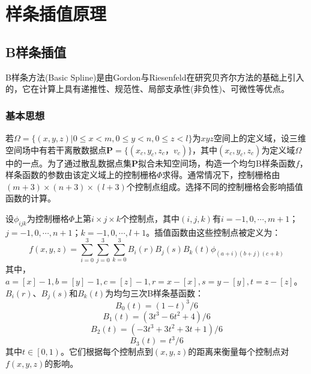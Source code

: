 \section{样条插值原理}

\subsection{B样条插值}
B样条方法(Basic Spline)是由Gordon与Riesenfeld在研究贝齐尔方法的基础上引入的，它在计算上具有递推性、规范性、局部支承性(非负性)、可微性等优点。

\subsubsection{基本思想}
若$ \Omega = \{ \left( x,y,z \right) | 0 \leq x <  m, 0 \leq y < n, 0 \leq z < l \}  $为$ xyz $空间上的定义域，设三维空间场中有若干离散数据点$ \mathbf{P} = \{ \left( x_{c},y_{c},z_{c}，v_{c} \right) \} $，其中$ \left( x_{c},y_{c},z_{c} \right) $为定义域$ \Omega $中的一点。为了通过散乱数据点集$ \mathbf{P} $拟合未知空间场，构造一个均匀B样条函数$ f $，样条函数的参数由该定义域上的控制栅格$ \Phi $求得。通常情况下，控制栅格由$ \left( m+3 \right) \times \left( n+3 \right) \times \left( l+3 \right) $个控制点组成。选择不同的控制栅格会影响插值函数的计算。

设$ \phi_{ijk} $为控制栅格$ \Phi $上第$ i \times j \times k $个控制点，其中$ \left( i,j,k \right) $有$ i=-1,0,\cdots,m+1 $；$ j=-1,0,\cdots,n+1 $；$ k=-1,0,\cdots,l+1 $。插值函数由这些控制点被定义为：
\begin{equation}
    f(x,y,z)=\sum_{i=0}^{3}\sum_{j=0}^{3}\sum_{k=0}^{3}B_{i}(r)B_{j}(s)B_{k}(t) \phi_{(a+i)(b+j)(c+k)}
    \label{三次B样条插值函数}
\end{equation}
其中，$ a=[x]-1,b=[y]-1,c=[z]-1,r=x-[x],s=y-[y],t=z-[z]$。$ B_{i}(r)\text{、}B_{j}(s)\text{和}B_{k}(t) $为均匀三次B样条基函数：
\begin{equation*}
    B_{0} \left( t \right) = \left( 1 - t \right)^{3} / 6
\end{equation*}
\begin{equation*}
    B_{1} \left( t \right) = \left( 3 t^{3} - 6 t^{2} + 4 \right) / 6
\end{equation*}
\begin{equation*}
    B_{2} \left( t \right) = \left( -3 t^{3} + 3 t^{2}  + 3 t + 1 \right) / 6
\end{equation*}
\begin{equation*}
    B_{3} \left( t \right) = t^{3} / 6
\end{equation*}
其中$ t \in \left[ 0, 1 \right) $。它们根据每个控制点到$ \left( x,y,z \right) $的距离来衡量每个控制点对$ f\left( x,y,z \right) $的影响。

